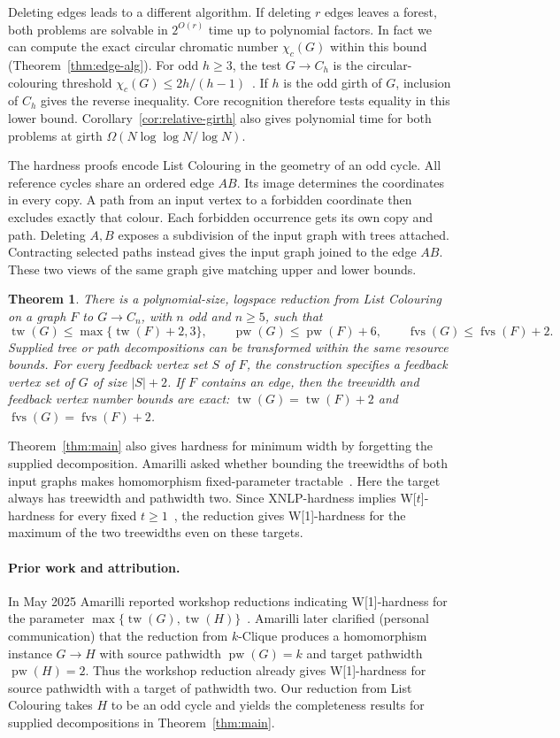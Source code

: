 \documentclass[11pt]{article}
\newtheorem{theorem}{Theorem}
\theoremstyle{remark}
\DeclareMathOperator{\tw}{tw}
\DeclareMathOperator{\pw}{pw}
\DeclareMathOperator{\fvs}{fvs}
\begin{document}
Deleting edges leads to a different algorithm. If deleting $r$ edges
leaves a forest, both problems are solvable in $2^{O(r)}$ time up to
polynomial factors. In fact we can compute the exact circular chromatic
number $\chi_c(G)$ within this bound (Theorem~\ref{thm:edge-alg}).
For odd $h\geq3$, the test $G\to C_h$ is the circular-colouring threshold
$\chi_c(G)\leq 2h/(h-1)$~\cite{zhu2001}. If $h$ is the odd girth of
$G$, inclusion of $C_h$ gives the reverse inequality. Core recognition
therefore tests equality in this lower bound. Corollary~\ref{cor:relative-girth}
also gives polynomial time for both problems at girth
$\Omega(N\log\log N/\log N)$.

The hardness proofs encode List Colouring in the geometry of an odd cycle.
All reference cycles share an ordered edge $AB$. Its image determines
the coordinates in every copy. A path from an input vertex to a forbidden
coordinate then excludes exactly that colour. Each forbidden occurrence
gets its own copy and path. Deleting $A,B$ exposes a subdivision of the
input graph with trees attached. Contracting selected paths instead gives
the input graph joined to the edge $AB$. These two views of the same graph
give matching upper and lower bounds.

\begin{theorem}\label{thm:transfer}
There is a polynomial-size, logspace reduction from List Colouring on a
graph $F$ to $G\to C_n$, with $n$ odd and $n\geq5$, such that
\[
 \tw(G)\leq\max\{\tw(F)+2,3\},\qquad
 \pw(G)\leq\pw(F)+6,\qquad
 \fvs(G)\leq\fvs(F)+2.
\]
Supplied tree or path decompositions can be transformed within the same
resource bounds. For every feedback vertex set $S$ of $F$, the construction
specifies a feedback vertex set of $G$ of size $|S|+2$. If $F$ contains an edge, then the treewidth and
feedback vertex number bounds are exact:
$\tw(G)=\tw(F)+2$ and $\fvs(G)=\fvs(F)+2$.
\end{theorem}

Theorem~\ref{thm:main} also gives hardness for minimum width by forgetting
the supplied decomposition. Amarilli asked whether bounding the treewidths
of both input graphs makes homomorphism fixed-parameter
tractable~\cite{amarilli2016}. Here the target always has treewidth and
pathwidth two. Since XNLP-hardness implies W[$t$]-hardness for every fixed
$t\geq1$~\cite[Lemma~2]{bgns2024}, the reduction gives W[1]-hardness for
the maximum of the two treewidths even on these targets.

\paragraph{Prior work and attribution.}
In May 2025 Amarilli reported workshop reductions indicating
W[1]-hardness for the parameter $\max\{\tw(G),\tw(H)\}$~\cite{amarilli2016}.
Amarilli later clarified (personal communication) that the reduction from
$k$-Clique produces a homomorphism instance $G\to H$ with source pathwidth
$\pw(G)=k$ and target pathwidth $\pw(H)=2$. Thus the workshop reduction
already gives W[1]-hardness for source pathwidth with a target of pathwidth
two. Our reduction from List Colouring takes $H$ to be an odd cycle and
yields the completeness results for supplied decompositions in
Theorem~\ref{thm:main}.
\end{document}
